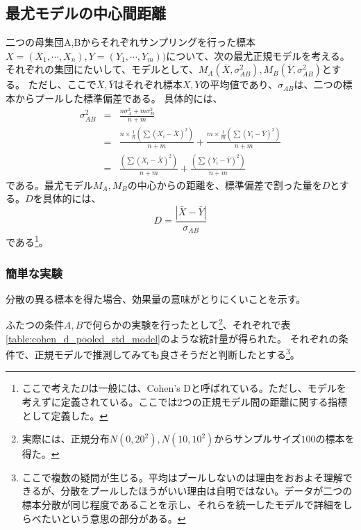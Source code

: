 \subsection{最尤モデルの中心間距離}
二つの母集団A,Bからそれぞれサンプリングを行った標本$X=(X_1,\cdots,X_n),Y=(Y_1,\cdots,Y_m))$について、次の最尤正規モデルを考える。
それぞれの集団にたいして、モデルとして、$M_A(\bar{X},\sigma_{AB}^2),M_B(\bar{Y},\sigma_{AB}^2)$とする。
ただし、ここで$\bar{X},\bar{Y}$はそれぞれ標本$X,Y$の平均値であり、$\sigma_{AB}$は、二つの標本からプールした標準偏差である。
具体的には、
\begin{eqnarray*}
 \sigma_{AB}^2 &=& \frac{n\sigma_A^2+m\sigma_B^2 }{n+m}\\
 & = & \frac{n\times \frac{1}{n}(\sum (X_i -\bar{X})^2)  }{n+m} + \frac{m\times \frac{1}{m} (\sum (Y_i -\bar{Y})^2)  }{n+m} \\
 & = & \frac{(\sum (X_i -\bar{X})^2)  }{n+m} + \frac{(\sum (Y_i -\bar{Y})^2)  }{n+m}
\end{eqnarray*}
である。最尤モデル$M_A,M_B$の中心からの距離を、標準偏差で割った量を$D$とする。$D$を具体的には、
\begin{equation*}
 D = \frac{|\bar{X}-\bar{Y}|}{\sigma_{AB}}
\end{equation*}
である\footnote{ここで考えた$D$は一般には、Cohen's Dと呼ばれている。ただし、モデルを考えずに定義されている。ここでは2つの正規モデル間の距離に関する指標として定義した。}。

\subsubsection{簡単な実験}
分散の異る標本を得た場合、効果量の意味がとりにくいことを示す。

ふたつの条件$A,B$で何らかの実験を行ったとして\footnote{実際には、正規分布$N(0,20^2),N(10,10^2)$からサンプルサイズ$100$の標本を得た。}、それぞれで表\ref{table:cohen_d_pooled_std_model}のような統計量が得られた。
それぞれの条件で、正規モデルで推測してみても良さそうだと判断したとする\footnote{ここで複数の疑問が生じる。平均はプールしないのは理由をおおよそ理解できるが、分散をプールしたほうがいい理由は自明ではない。データが二つの標本分散が同じ程度であることを示し、それらを統一したモデルで詳細をしらべたいという意思の部分がある。}。

